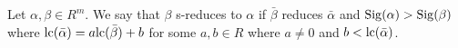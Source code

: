 \documentclass[twoside]{article}
\begin{document}
\begin{definition}[S-Reduction]
    Let \(\alpha, \beta \in R^m\). We say that \(\beta\) s-reduces to \(\alpha\)
    if \(\bar{\beta}\) reduces \(\bar{\alpha}\) and \(\mathrm{Sig}(\alpha)
    > \mathrm{Sig}(\beta)\) where \(\mathrm{lc}(\bar{\alpha}) =
    a\mathrm{lc}(\bar{\beta}) + b\) for some \(a, b \in R\) where \(a \neq
    0\) and \(b < \mathrm{lc}(\bar{\alpha})\).
\end{definition}
\end{document}
